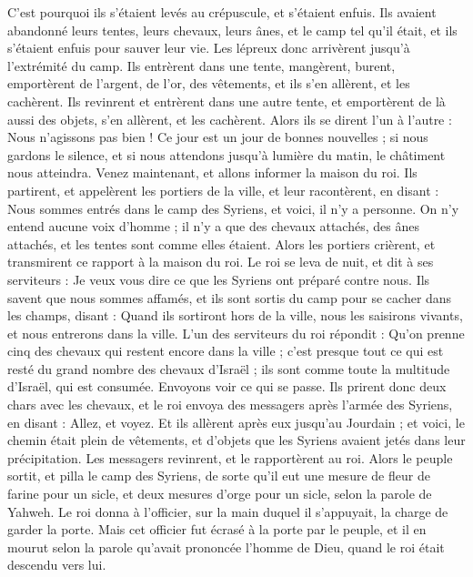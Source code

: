 \begin{multicols}{2}
C’est pourquoi ils s’étaient levés au crépuscule, et s’étaient enfuis. Ils avaient abandonné leurs tentes, leurs chevaux, leurs ânes, et le camp tel qu’il était, et ils s’étaient enfuis pour sauver leur vie.
Les lépreux donc arrivèrent jusqu’à l’extrémité du camp. Ils entrèrent dans une tente, mangèrent, burent, emportèrent de l’argent, de l’or, des vêtements, et ils s’en allèrent, et les cachèrent. Ils revinrent et entrèrent dans une autre tente, et emportèrent de là aussi des objets, s’en allèrent, et les cachèrent.
Alors ils se dirent l’un à l’autre : Nous n’agissons pas bien ! Ce jour est un jour de bonnes nouvelles ; si nous gardons le silence, et si nous attendons jusqu’à lumière du matin, le châtiment nous atteindra. Venez maintenant, et allons informer la maison du roi.
Ils partirent, et appelèrent les portiers de la ville, et leur racontèrent, en disant : Nous sommes entrés dans le camp des Syriens, et voici, il n’y a personne. On n’y entend aucune voix d’homme ; il n’y a que des chevaux attachés, des ânes attachés, et les tentes sont comme elles étaient.
Alors les portiers crièrent, et transmirent ce rapport à la maison du roi.
Le roi se leva de nuit, et dit à ses serviteurs : Je veux vous dire ce que les Syriens ont préparé contre nous. Ils savent que nous sommes affamés, et ils sont sortis du camp pour se cacher dans les champs, disant : Quand ils sortiront hors de la ville, nous les saisirons vivants, et nous entrerons dans la ville.
L’un des serviteurs du roi répondit : Qu’on prenne cinq des chevaux qui restent encore dans la ville ; c’est presque tout ce qui est resté du grand nombre des chevaux d’Israël ; ils sont comme toute la multitude d’Israël, qui est consumée. Envoyons voir ce qui se passe.
Ils prirent donc deux chars avec les chevaux, et le roi envoya des messagers après l’armée des Syriens, en disant : Allez, et voyez.
Et ils allèrent après eux jusqu’au Jourdain ; et voici, le chemin était plein de vêtements, et d’objets que les Syriens avaient jetés dans leur précipitation. Les messagers revinrent, et le rapportèrent au roi.
Alors le peuple sortit, et pilla le camp des Syriens, de sorte qu’il eut une mesure de fleur de farine pour un sicle, et deux mesures d’orge pour un sicle, selon la parole de Yahweh.
Le roi donna à l’officier, sur la main duquel il s’appuyait, la charge de garder la porte. Mais cet officier fut écrasé à la porte par le peuple, et il en mourut selon la parole qu’avait prononcée l’homme de Dieu, quand le roi était descendu vers lui.

\end{multicols}
